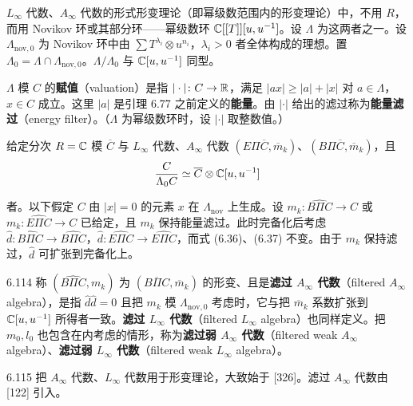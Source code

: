 
$L_{\infty}$ 代数、$A_{\infty}$ 代数的形式形变理论（即幂级数范围内的形变理论）中，不用 $R$，而用 Novikov 环或其部分环——幂级数环 $\mathbb{C}[[T]][u,u^{-1}]$。设 $\Lambda$ 为这两者之一。设 $\Lambda_{\mathrm{nov},0}$ 为 Novikov 环中由 $\sum T^{\lambda_i}\otimes u^{n_i}$，$\lambda_i>0$ 者全体构成的理想。置 $\Lambda_0=\Lambda\cap\Lambda_{\mathrm{nov},0}$。$\Lambda/\Lambda_0$ 与 $\mathbb{C}[u,u^{-1}]$ 同型。

$\Lambda$ 模 $C$ 的\textbf{赋值}（valuation）是指 $|\cdot|\colon C\to\mathbb{R}$，满足 $|ax|\ge|a|+|x|$ 对 $a\in\Lambda$，$x\in C$ 成立。这里 $|a|$ 是引理 6.77 之前定义的\textbf{能量}。由 $|\cdot|$ 给出的滤过称为\textbf{能量滤过}（energy filter）。（$\Lambda$ 为幂级数环时，设 $|\cdot|$ 取整数值。）

给定分次 $R=\mathbb{C}$ 模 $\overline C$ 与 $L_{\infty}$ 代数、$A_{\infty}$ 代数 $(E\Pi\overline C,\overline m_k)$、$(B\Pi\overline C,\overline m_k)$，且
\[
  \frac{C}{\Lambda_0C}\simeq\overline C\otimes\mathbb{C}[u,u^{-1}]
\]

者。以下假定 $C$ 由 $|x|=0$ 的元素 $x$ 在 $\Lambda_{\mathrm{nov}}$ 上生成。设 $m_k\colon\widehat{B\Pi C}\to C$ 或 $m_k\colon\widehat{E\Pi C}\to C$ 已给定，且 $m_k$ 保持能量滤过。此时完备化后考虑 $\hat d\colon\widehat{B\Pi C}\to\widehat{B\Pi C}$，$\hat d\colon\widehat{E\Pi C}\to\widehat{E\Pi C}$，而式 (6.36)、(6.37) 不变。由于 $m_k$ 保持滤过，$\hat d$ 可扩张到完备化上。

\begin{definition}{6.114}
  称 $(\widehat{B\Pi C},m_k)$ 为 $(\overline{B\Pi C},\overline m_k)$ 的形变、且是\textbf{滤过 $A_{\infty}$ 代数}（filtered $A_{\infty}$ algebra），是指 $\hat d\hat d=0$ 且把 $m_k$ 模 $\Lambda_{\mathrm{nov},0}$ 考虑时，它与把 $\overline m_k$ 系数扩张到 $\mathbb{C}[u,u^{-1}]$ 所得者一致。\textbf{滤过 $L_{\infty}$ 代数}（filtered $L_{\infty}$ algebra）也同样定义。把 $m_0,l_0$ 也包含在内考虑的情形，称为\textbf{滤过弱 $A_{\infty}$ 代数}（filtered weak $A_{\infty}$ algebra）、\textbf{滤过弱 $L_{\infty}$ 代数}（filtered weak $L_{\infty}$ algebra）。
\end{definition}

\begin{remark}{6.115}
  把 $A_{\infty}$ 代数、$L_{\infty}$ 代数用于形变理论，大致始于 [326]。滤过 $A_{\infty}$ 代数由 [122] 引入。
\end{remark}

